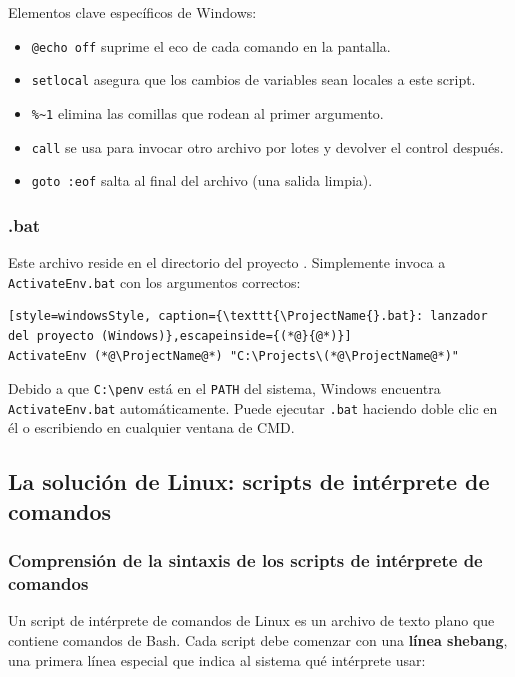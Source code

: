 Elementos clave específicos de Windows:
\begin{itemize}
  \item \texttt{@echo off} suprime el eco de cada comando en la pantalla.
  \item \texttt{setlocal} asegura que los cambios de variables sean locales
        a este script.
  \item \texttt{\%\textasciitilde1} elimina las comillas que rodean al
        primer argumento.
  \item \texttt{call} se usa para invocar otro archivo por lotes y devolver
        el control después.
  \item \texttt{goto :eof} salta al final del archivo (una salida limpia).
\end{itemize}

\subsubsection{\ProjectName{}.bat}

Este archivo reside en el directorio del proyecto \ProjectName{}. Simplemente
invoca a \texttt{ActivateEnv.bat} con los argumentos correctos:

\begin{lstlisting}[style=windowsStyle, caption={\texttt{\ProjectName{}.bat}: lanzador del proyecto (Windows)},escapeinside={(*@}{@*)}]
ActivateEnv (*@\ProjectName@*) "C:\Projects\(*@\ProjectName@*)"
\end{lstlisting}

Debido a que \texttt{C:\textbackslash penv} está en el \texttt{PATH} del
sistema, Windows encuentra \texttt{ActivateEnv.bat} automáticamente. Puede
ejecutar \texttt{\ProjectName{}.bat} haciendo doble clic en él o escribiendo
\texttt{\ProjectName{}} en cualquier ventana de CMD.

\subsection{La solución de Linux: scripts de intérprete de comandos}
\label{subsec:linux-scripts}

\subsubsection{Comprensión de la sintaxis de los scripts de intérprete de comandos}

Un script de intérprete de comandos de Linux es un archivo de texto plano que
contiene comandos de Bash. Cada script debe comenzar con una \textbf{línea
shebang}, una primera línea especial que indica al sistema qué intérprete
usar:


